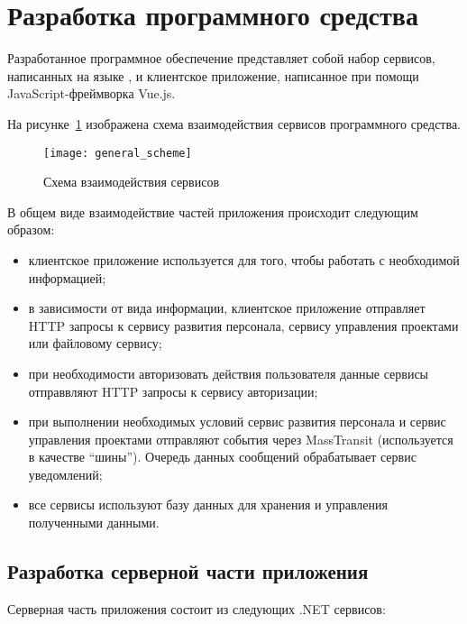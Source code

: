 \section{Разработка программного средства}\label{sec:development}

Разработанное программное обеспечение представляет собой набор сервисов, написанных на языке \csharp, и клиентское приложение, написанное при помощи JavaScript-фреймворка Vue.js.

На рисунке~\ref{fig:general_scheme} изображена схема взаимодействия сервисов программного средства.

\begin{figure}[ht]
    \centering
    \texttt{[image: general\_scheme]}
    \caption{Схема взаимодействия сервисов}\label{fig:general_scheme}
\end{figure}

В общем виде взаимодействие частей приложения происходит следующим образом:
\begin{itemize}
    \item клиентское приложение используется для того, чтобы работать с необходимой информацией;
    \item в зависимости от вида информации, клиентское приложение отправляет HTTP запросы к сервису развития персонала, сервису управления проектами или файловому сервису;
    \item при необходимости авторизовать действия пользователя данные сервисы отправвляют HTTP запросы к сервису авторизации;
    \item при выполнении необходимых условий сервис развития персонала и сервис управления проектами отправляют события через MassTransit (используется в качестве ``шины''). Очередь данных сообщений обрабатывает сервис уведомлений;
    \item все сервисы используют базу данных для хранения и управления полученными данными.
\end{itemize}

\subsection{Разработка серверной части приложения}\label{sec:development:services}

Серверная часть приложения состоит из следующих .NET сервисов:

